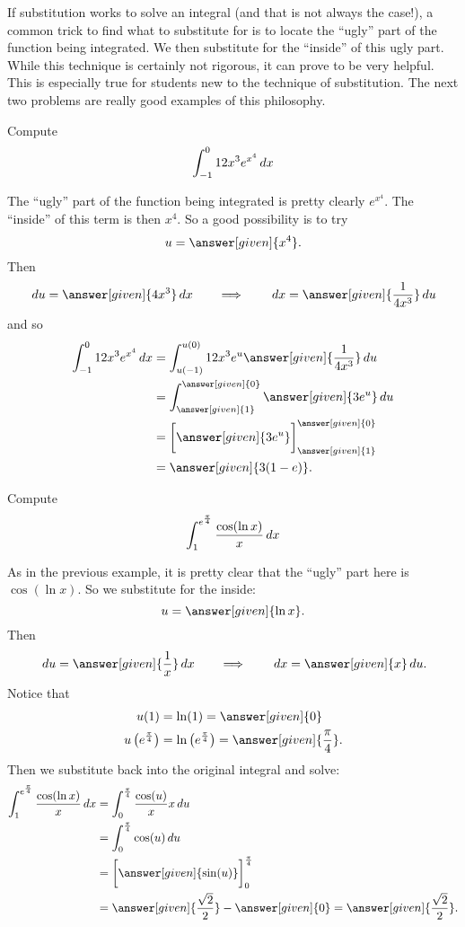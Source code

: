 \documentclass{ximera}
\begin{document}
If substitution works to solve an integral (and that is not always the case!), a common trick to find what to substitute for is to locate the ``ugly'' part of the function being integrated.
We then substitute for the ``inside'' of this ugly part.  
While this technique is certainly not rigorous, it can prove to be very helpful.  
This is especially true for students new to the technique of substitution.  
The next two problems are really good examples of this philosophy.

\begin{example}
Compute
\[
\int_{-1}^0 12x^3 e^{x^4} \,d x
\]
\begin{explanation}
The ``ugly'' part of the function being integrated is pretty clearly $e^{x^4}$.  
The ``inside'' of this term is then $x^4$.  
So a good possibility is to try 
\[
u = \answer[given]{x^4}.
\]
Then
\[
\d u = \answer[given]{4x^3} \d x 	\qquad	\Longrightarrow	\qquad	\d x = \answer[given]{\frac{1}{4x^3}} \d u
\]
and so
\begin{align*}
\int_{-1}^0 12x^3 e^{x^4} \d x &= \int_{u(-1)}^{u(0)} 12 x^3 e^u \answer[given]{\frac{1}{4x^3}} \d u  \\
&= \int_{\answer[given]{1}}^{\answer[given]{0}} \answer[given]{3 e^u} \d u  \\
&= \eval{\answer[given]{3e^u}}_{\answer[given]{1}}^{\answer[given]{0}}  \\
&= \answer[given]{3(1-e)}.
\end{align*}
\end{explanation}
\end{example}




\begin{example} Compute
\[
\int_{1}^{e^{\frac{\pi}{4}}} \frac{\cos(\ln x)}{x} \,d x
\]
\begin{explanation}
As in the previous example, it is pretty clear that the ``ugly'' part here is $\cos(\ln x)$.  
So we substitute for the inside:
\[
u = \answer[given]{\ln x}.
\]
Then
\[
\d u = \answer[given]{\frac{1}{x}} \d x 	\qquad	\Longrightarrow	\qquad	\d x = \answer[given]{x} \d u.
\]
Notice that
\begin{align*}
u(1) &= \ln (1) = \answer[given]{0} \\
u \left( e^{\frac{\pi}{4}} \right) &= \ln \left( e^{\frac{\pi}{4}} \right) = \answer[given]{\frac{\pi}{4}}.
\end{align*}
Then we substitute back into the original integral and solve:
\begin{align*}
\int_{1}^{e^{\frac{\pi}{4}}} \frac{\cos(\ln x)}{x} \d x &= \int_0^{\frac{\pi}{4}} \frac{\cos(u)}{x} x \d u  \\
&= \int_0^{\frac{\pi}{4}} \cos(u) \d u  \\
&= \eval{\answer[given]{\sin(u)}}_{0}^{\frac{\pi}{4}}  \\
&= \answer[given]{\frac{\sqrt{2}}{2}} - \answer[given]{0} = \answer[given]{\frac{\sqrt{2}}{2}}.
\end{align*}
\end{explanation}
\end{example}
\end{document}
